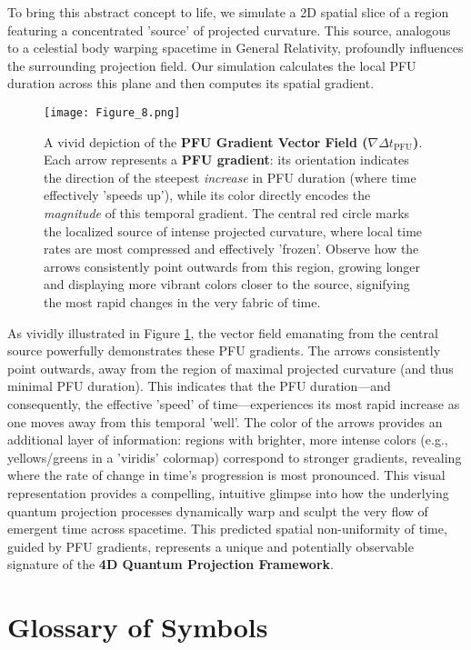 \documentclass[12pt,a4paper]{article}
\numberwithin{equation}{section}
\begin{document}
To bring this abstract concept to life, we simulate a 2D spatial slice of a region featuring a concentrated 'source' of projected curvature. This source, analogous to a celestial body warping spacetime in General Relativity, profoundly influences the surrounding projection field. Our simulation calculates the local PFU duration across this plane and then computes its spatial gradient.

\begin{figure}[H]
    \centering
    \texttt{[image: Figure\_8.png]} %
    \caption{A vivid depiction of the \textbf{PFU Gradient Vector Field ($\nabla \Delta t_{\text{PFU}}$)}. Each arrow represents a \textbf{PFU gradient}: its orientation indicates the direction of the steepest \textit{increase} in PFU duration (where time effectively 'speeds up'), while its color directly encodes the \textit{magnitude} of this temporal gradient. The central red circle marks the localized source of intense projected curvature, where local time rates are most compressed and effectively 'frozen'. Observe how the arrows consistently point outwards from this region, growing longer and displaying more vibrant colors closer to the source, signifying the most rapid changes in the very fabric of time.}
    \label{fig:pfu_gradient_vector_field}
\end{figure}

As vividly illustrated in Figure \ref{fig:pfu_gradient_vector_field}, the vector field emanating from the central source powerfully demonstrates these PFU gradients. The arrows consistently point outwards, away from the region of maximal projected curvature (and thus minimal PFU duration). This indicates that the PFU duration—and consequently, the effective 'speed' of time—experiences its most rapid increase as one moves away from this temporal 'well'. The color of the arrows provides an additional layer of information: regions with brighter, more intense colors (e.g., yellows/greens in a 'viridis' colormap) correspond to stronger gradients, revealing where the rate of change in time's progression is most pronounced. This visual representation provides a compelling, intuitive glimpse into how the underlying quantum projection processes dynamically warp and sculpt the very flow of emergent time across spacetime. This predicted spatial non-uniformity of time, guided by PFU gradients, represents a unique and potentially observable signature of the \textbf{4D Quantum Projection Framework}.

\section{Glossary of Symbols}
\label{app:symbols_glossary}
\end{document}
